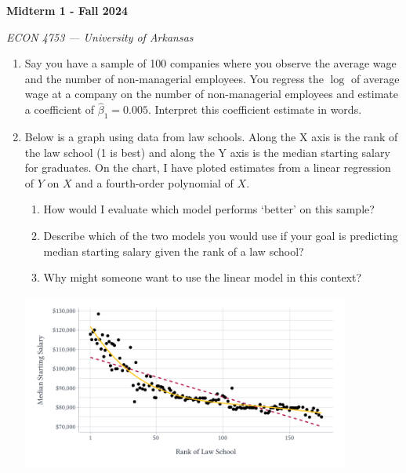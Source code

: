 \documentclass[12pt]{article}
\begin{document}
\begin{center}
  {\Huge\bf Midterm 1 - Fall 2024}
  
  \smallskip
  {\large\it  ECON 4753 — University of Arkansas}
\end{center}

\vspace{5mm}
\begin{enumerate}
  \item Say you have a sample of 100 companies where you observe the average wage and the number of non-managerial employees. You regress the $\log$ of average wage at a company on the number of non-managerial employees and estimate a coefficient of $\hat{\beta}_1 = 0.005$. Interpret this coefficient estimate in words.
  




  \vspace{5mm}
  \item Below is a graph using data from law schools. Along the X axis is the rank of the law school (1 is best) and along the Y axis is the median starting salary for graduates. On the chart, I have ploted estimates from a linear regression of $Y$ on $X$ and a fourth-order polynomial of $X$.
  \begin{enumerate}
    \item How would I evaluate which model performs `better' on this sample?
    
    \item Describe which of the two models you would use if your goal is predicting median starting salary given the rank of a law school? 
    
    \item Why might someone want to use the linear model in this context?
  \end{enumerate}

  \begin{center}
    \includegraphics[width = 0.85\textwidth]{figures/plot_law_school_rank_and_salary.pdf}
  \end{center}






\end{enumerate}
\end{document}
